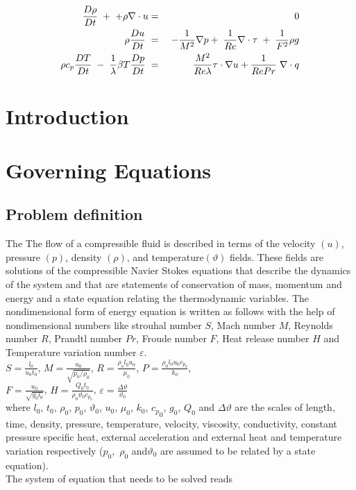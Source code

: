 \documentclass[11pt,a4paper]{article}
\begin{document}
\begin{eqnarray}
\frac{D \rho}{D t}\hspace{1mm}+\hspace{1mm}+ \rho \nabla\cdot u &=& 0 \\
\rho\frac{D u}{D t}\hspace{1mm} &=&\hspace{1mm}-\frac{1}{M^2}\nabla p +\hspace{1mm}\frac{1}{Re}\nabla\cdot\tau \hspace{1mm}+\hspace{1mm}\frac{1}{F^2} \rho g \\
 \rho c_p \frac{D T}{D t}\hspace{1mm}-\hspace{1mm}\frac{1}{\lambda} \beta T \frac{D p}{D t} \hspace{1mm} &=& \hspace{1mm} \frac{M^2}{Re \lambda} \tau \cdot\nabla u  + \frac{1}{RePr} \hspace{1mm} \nabla \cdot q
\end{eqnarray}

\section{Introduction}
\section{Governing Equations}
\subsection{Problem definition}
The The flow of a compressible fluid is described in terms of the velocity $(u)$, pressure $(p)$, density $(\rho)$, and temperature$(\vartheta)$ fields. These fields are solutions of the compressible Navier Stokes equations that describe the dynamics of the system
and that are statements of conservation of mass, momentum and energy and a state equation relating the thermodynamic variables. The nondimensional form of energy equation is written as follows with the help of nondimensional numbers like strouhal number $S$, Mach number $M$, Reynolds number $R$, Prandtl number $Pr$, Froude number $F$, Heat release number $H$ and Temperature variation number $\varepsilon$. \\
$S=\frac{l_0}{u_0t_0}$,  $M=\frac{u_0}{\sqrt{p_0/\rho_0}}$, $R=\frac{\rho_ol_0u_0}{\mu_0}$, $P=\frac{\rho_0l_0u_0c_{p_0}}{k_0}$, \\ $F=\frac{u_0}{\sqrt{g_0l_0}}$, $H=\frac{Q_0t_0}{\rho_0\vartheta_0c_{p_0}}$, $\varepsilon=\frac{{\Delta}\vartheta}{\vartheta_0}$\\
where $l_0$, $t_0$, $\rho_0$, $p_0$, $\vartheta_0$, $u_0$, $\mu_0$, $k_0$, ${c_p}_0$, $g_0$, $Q_0$ and $\Delta\vartheta$ are the scales of length,
time, density, pressure, temperature, velocity, viscosity, conductivity, constant
pressure specific heat, external acceleration and external heat and temperature
variation respectively ($p_0,$ $\rho_0$ and$ \vartheta_0$ are assumed to be related by a state
equation).\\
The system of equation that needs to be solved reads
\end{document}
